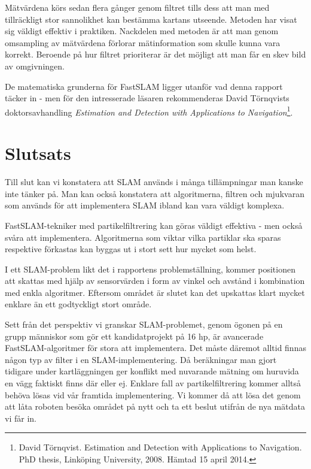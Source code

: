 \documentclass[a4paper,12pt,fleqn]{article}
\begin{document}
Mätvärdena körs sedan flera gånger genom filtret tills dess att man med tillräckligt stor sannolikhet kan bestämma kartans utseende. Metoden har visat sig väldigt effektiv i praktiken. Nackdelen med metoden är att man genom omsampling av mätvärdena förlorar mätinformation som skulle kunna vara korrekt. Beroende på hur filtret prioriterar är det möjligt att man får en skev bild av omgivningen.

De matematiska grunderna för FastSLAM ligger utanför vad denna rapport täcker in - men för den intresserade läsaren rekommenderas David Törnqvists doktorsavhandling \textit{Estimation and Detection with Applications to Navigation}\footnote{David Törnqvist. Estimation and Detection with Applications to Navigation. PhD thesis, Linköping University, 2008. Hämtad 15 april 2014.}.

\newpage
\section{Slutsats}

Till slut kan vi konstatera att SLAM används i många tillämpningar man kanske inte tänker på. Man kan också konstatera att algoritmerna, filtren och mjukvaran som används för att implementera SLAM ibland kan vara väldigt komplexa. 

FastSLAM-tekniker med partikelfiltrering kan göras väldigt effektiva - men också svåra att implementera. Algoritmerna som viktar vilka partiklar ska sparas respektive förkastas kan byggas ut i stort sett hur mycket som helst. 

I ett SLAM-problem likt det i rapportens problemställning, kommer positionen att skattas med hjälp av sensorvärden i form av vinkel och avstånd i kombination med enkla algoritmer. Eftersom området är slutet kan det upskattas klart mycket enklare än ett godtyckligt stort område. 

Sett från det perspektiv vi granskar SLAM-problemet, genom ögonen på en grupp människor som gör ett kandidatprojekt på 16 hp, är avancerade FastSLAM-algoritmer för stora att implementera. Det måste däremot alltid finnas någon typ av filter i en SLAM-implementering. Då beräkningar man gjort tidigare under kartläggningen ger konflikt med nuvarande mätning om huruvida en vägg faktiskt finns där eller ej. Enklare fall av partikelfiltrering kommer alltså behöva lösas vid vår framtida implementering. Vi kommer då att lösa det genom att låta roboten besöka området på nytt och ta ett beslut utifrån de nya mätdata vi får in. 
\end{document}
